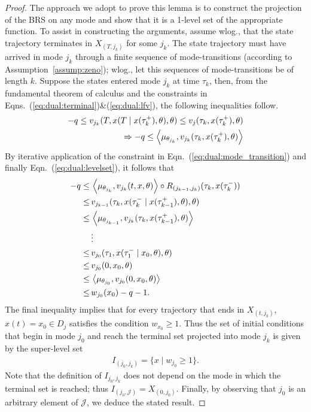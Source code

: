     \begin{proof}
    The approach we adopt to prove this lemma is to construct the projection of the BRS on any mode and show that it is a 1-level set of the appropriate function. To assist in constructing the arguments, assume wlog., that the state trajectory terminates in $X_{(T,j_k)}$ for some $j_k$. The state trajectory must have arrived in mode $j_k$ through a finite sequence of mode-transitions (according to Assumption~\ref{assump:zeno}); wlog., let this sequences of mode-transitions be of length $k$. Suppose the states entered mode $j_k$ at time $\tau_k$, then, from the fundamental theorem of calculus and the constraints in Eqns.~(\ref{eq:dual:terminal})\&(\ref{eq:dual:lfv}), the following inequalities follow.
    \begin{align}
      -q\le v_{j_k}(T,x(T\mid x(\tau_k^+),\theta),\theta)\le v_j(\tau_k,x(\tau_k^+),\theta)\\
      \Rightarrow -q\le \left\langle \mu_{\theta_{j_k}},v_{j_k}(\tau_k,x(\tau_k^+),\theta)\right\rangle
    \end{align}
    By iterative application of the constraint in Eqn.~(\ref{eq:dual:mode_transition}) and finally Eqn.~(\ref{eq:dual:levelset}), it follows that
    \begin{align}
      -q\le&\, \left\langle \mu_{\theta_{j_k}},v_{j_k}(t,x,\theta)\right\rangle\circ R_{(j_{k-1},j_{k})}(\tau_{k},x(\tau_{k}^-))\\
      \le&\, v_{j_{k-1}}(\tau_{k},x(\tau_{k}^-\mid x(\tau_{k-1}^+),\theta),\theta)\\
      \le &\, \left\langle \mu_{\theta_{j_{k-1}}},v_{j_k}(\tau_k,x(\tau_{k-1}^+),\theta)\right\rangle\\\nonumber
      &\,\vdots\\
      \le &\,v_{j_0}(\tau_1,x(\tau_1^-\mid x_0,\theta),\theta)\\
      \le &\,v_{j_0}(0,x_0,\theta)\\
      \le &\,\left\langle \mu_{\theta_{j_0}},v_{j_0}(0,x_0,\theta)\right\rangle\\
      \le &\, w_{j_0}(x_0)-q-1.
    \end{align}
    The final inequality implies that for every trajectory that ends in $X_{(t,j_k)}$, $x(t)=x_0\in D_{j}$  satisfies the condition $w_{x_0}\ge 1$. Thus the set of initial conditions that begin in mode $j_0$ and reach the terminal set projected into mode $j_k$ is given by the super-level set
    \begin{align}
      I_{(j_0,j_k)}=\{x\mid w_{j_0}\ge 1\}.
    \end{align}
    Note that the definition of $I_{j_0,j_k}$ does not depend on the mode in which the terminal set is reached; thus \mbox{$I_{(j_0,\mathcal J)}=X_{(0,j_0)}$}. Finally, by observing that $j_0$ is an arbitrary element of $\mathcal J$, we deduce the stated result.
    \end{proof}
